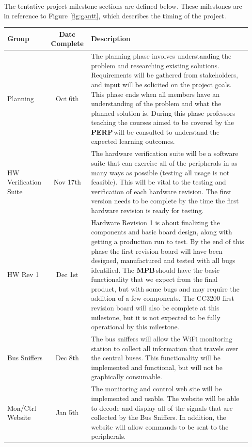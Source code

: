 \documentclass[letterpaper]{article}
\newcommand{\MPB}{\textbf{MPB}\,}
\newcommand{\PERP}{\textbf{PERP}\,}
\begin{document}
The tentative project milestone sections are defined below. These milestones are in reference to Figure \ref{fig:gantt}, which describes the timing of the project.
\begin{table}[htp!]
\centering
\begin{tabular}{lcp{}}

\toprule
Group & Date Complete & Description\\
\midrule

Planning & Oct 6th & The planning phase involves understanding the problem and researching existing solutions. Requirements will be gathered from stakeholders, and input will be solicited on the project goals. This phase ends when all members have an understanding of the problem and what the planned solution is. During this phase professors teaching the courses aimed to be covered by the \PERP will be consulted to understand the expected learning outcomes. \\
HW Verification Suite & Nov 17th & The hardware verification suite will be a software suite that can exercise all of the peripherals in as many ways as possible (testing all usage is not feasible). This will be vital to the testing and verification of each hardware revision. The first version needs to be complete by the time the first hardware revision is ready for testing. \\
HW Rev 1 & Dec 1st & Hardware Revision 1 is about finalizing the components and basic board design, along with getting a production run to test. By the end of this phase the first revision board will have been designed, manufactured and tested with all bugs identified. The \MPB should have the basic functionality that we expect from the final product, but with some bugs and may require the addition of a few components. The CC3200 first revision board will also be complete at this milestone, but it is not expected to be fully operational by this milestone. \\
Bus Sniffers & Dec 8th & The bus sniffers will allow the WiFi monitoring station to collect all information that travels over the central buses. This functionality will be implemented and functional, but will not be graphically consumable. \\
Mon/Ctrl Website & Jan 5th & The monitoring and control web site will be implemented and usable. The website will be able to decode and display all of the signals that are collected by the Bus Sniffers. In addition, the website will allow commands to be sent to the peripherals. \\

\end{tabular}
\end{table}
\end{document}

